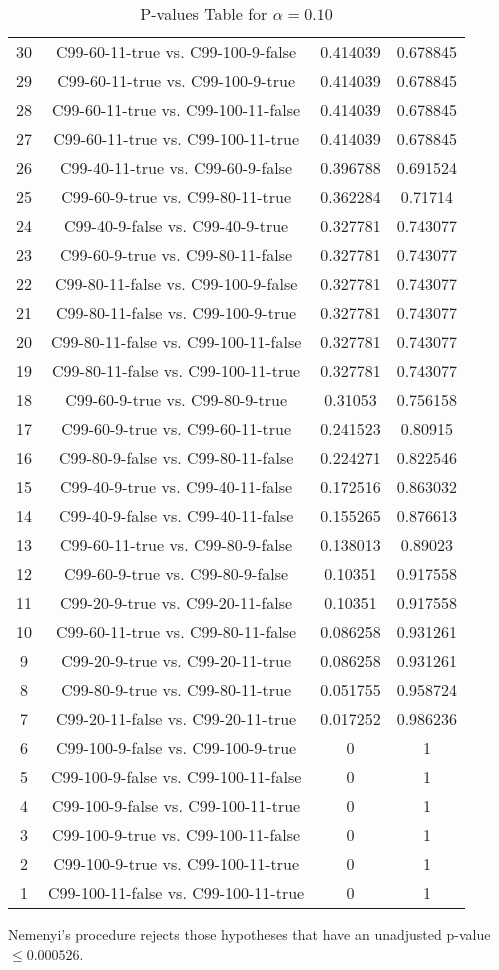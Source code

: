 \documentclass[a4paper,10pt]{article}
\begin{document}
\begin{landscape}
\begin{table}[!htp]
\begin{tabular}{cccc}
30&C99-60-11-true vs. C99-100-9-false&0.414039&0.678845\\
29&C99-60-11-true vs. C99-100-9-true&0.414039&0.678845\\
28&C99-60-11-true vs. C99-100-11-false&0.414039&0.678845\\
27&C99-60-11-true vs. C99-100-11-true&0.414039&0.678845\\
26&C99-40-11-true vs. C99-60-9-false&0.396788&0.691524\\
25&C99-60-9-true vs. C99-80-11-true&0.362284&0.71714\\
24&C99-40-9-false vs. C99-40-9-true&0.327781&0.743077\\
23&C99-60-9-true vs. C99-80-11-false&0.327781&0.743077\\
22&C99-80-11-false vs. C99-100-9-false&0.327781&0.743077\\
21&C99-80-11-false vs. C99-100-9-true&0.327781&0.743077\\
20&C99-80-11-false vs. C99-100-11-false&0.327781&0.743077\\
19&C99-80-11-false vs. C99-100-11-true&0.327781&0.743077\\
18&C99-60-9-true vs. C99-80-9-true&0.31053&0.756158\\
17&C99-60-9-true vs. C99-60-11-true&0.241523&0.80915\\
16&C99-80-9-false vs. C99-80-11-false&0.224271&0.822546\\
15&C99-40-9-true vs. C99-40-11-false&0.172516&0.863032\\
14&C99-40-9-false vs. C99-40-11-false&0.155265&0.876613\\
13&C99-60-11-true vs. C99-80-9-false&0.138013&0.89023\\
12&C99-60-9-true vs. C99-80-9-false&0.10351&0.917558\\
11&C99-20-9-true vs. C99-20-11-false&0.10351&0.917558\\
10&C99-60-11-true vs. C99-80-11-false&0.086258&0.931261\\
9&C99-20-9-true vs. C99-20-11-true&0.086258&0.931261\\
8&C99-80-9-true vs. C99-80-11-true&0.051755&0.958724\\
7&C99-20-11-false vs. C99-20-11-true&0.017252&0.986236\\
6&C99-100-9-false vs. C99-100-9-true&0&1\\
5&C99-100-9-false vs. C99-100-11-false&0&1\\
4&C99-100-9-false vs. C99-100-11-true&0&1\\
3&C99-100-9-true vs. C99-100-11-false&0&1\\
2&C99-100-9-true vs. C99-100-11-true&0&1\\
1&C99-100-11-false vs. C99-100-11-true&0&1\\
\hline
\end{tabular}
\caption{P-values Table for $\alpha=0.10$}
\end{table}Nemenyi's procedure rejects those hypotheses that have an unadjusted p-value $\le0.000526$.


\end{landscape}
\end{document}
